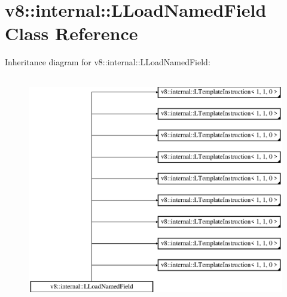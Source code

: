 \hypertarget{classv8_1_1internal_1_1_l_load_named_field}{}\section{v8\+:\+:internal\+:\+:L\+Load\+Named\+Field Class Reference}
\label{classv8_1_1internal_1_1_l_load_named_field}
Inheritance diagram for v8\+:\+:internal\+:\+:L\+Load\+Named\+Field\+:\begin{figure}[H]
\begin{center}
\leavevmode
\includegraphics[height=10.000000cm]{classv8_1_1internal_1_1_l_load_named_field}
\end{center}
\end{figure}
